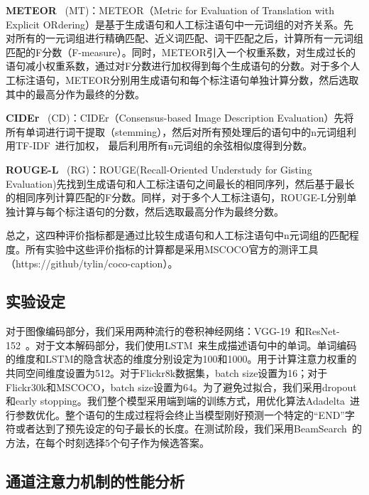 \noindent\textbf{METEOR}~\cite{banerjee2005meteor} (MT)：METEOR（Metric for Evaluation of Translation with Explicit ORdering）是基于生成语句和人工标注语句中一元词组的对齐关系。先对所有的一元词组进行精确匹配、近义词匹配、词干匹配之后，计算所有一元词组匹配的F分数（F-measure）。同时，METEOR引入一个权重系数，对生成过长的语句减小权重系数，通过对F分数进行加权得到每个生成语句的分数。对于多个人工标注语句，METEOR分别用生成语句和每个标注语句单独计算分数，然后选取其中的最高分作为最终的分数。

\noindent\textbf{CIDEr}~\cite{vedantam2015cider} (CD)：CIDEr（Consensus-based Image Description Evaluation）先将所有单词进行词干提取（stemming），然后对所有预处理后的语句中的n元词组利用TF-IDF~\cite{robertson2004understanding}进行加权，
最后利用所有n元词组的余弦相似度得到分数。

\noindent\textbf{ROUGE-L}~\cite{lin2002manual} (RG)：ROUGE(Recall-Oriented Understudy for Gisting Evaluation)先找到生成语句和人工标注语句之间最长的相同序列，然后基于最长的相同序列计算匹配的F分数。同样，对于多个人工标注语句，ROUGE-L分别单独计算与每个标注语句的分数，然后选取最高分作为最终分数。

总之，这四种评价指标都是通过比较生成语句和人工标注语句中n元词组的匹配程度。所有实验中这些评价指标的计算都是采用MSCOCO官方的测评工具（https://github/tylin/coco-caption）。



\subsection{实验设定}
对于图像编码部分，我们采用两种流行的卷积神经网络：VGG-19~\cite{simonyan2015very}和ResNet-152~\cite{he2016deep}。对于文本解码部分，我们使用LSTM~\cite{hochreiter1997long}来生成描述语句中的单词。单词编码的维度和LSTM的隐含状态的维度分别设定为100和1000。用于计算注意力权重的共同空间维度设置为512。对于Flickr8k数据集，batch size设置为16；对于Flickr30k和MSCOCO，batch size设置为64。为了避免过拟合，我们采用dropout和early stopping。我们整个模型采用端到端的训练方式，用优化算法Adadelta~\cite{zeiler2012adadelta}进行参数优化。整个语句的生成过程将会终止当模型刚好预测一个特定的“END”字符或者达到了预先设定的句子最长的长度。在测试阶段，我们采用BeamSearch~\cite{vinyals2015show}的方法，在每个时刻选择5个句子作为候选答案。


\subsection{通道注意力机制的性能分析}

